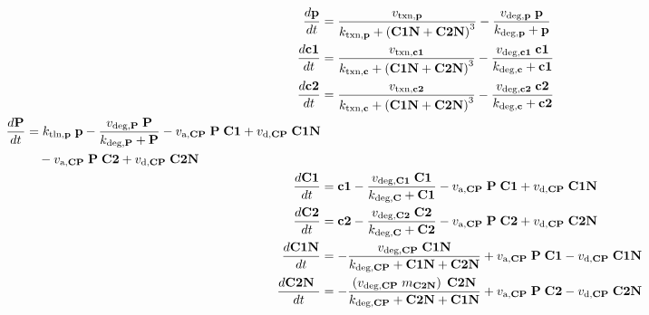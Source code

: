 \begin{model}[p]
  \centering

  \begin{align}
    \label{eq:p}
    \frac{d\mathrm{\bf p}}{dt}    & = \frac{v_{\text{txn,{\bf p}}}}{k_{\text{txn,{\bf p}}} + \left(\text{\bf C1N} + \text{\bf C2N} \right)^3} - \frac{v_{\text{deg,{\bf p}}} \;\text{\bf p} }{k_{\text{deg,{\bf p}}} +\text{\bf p} } \\
    \label{eq:c1}
    \frac{d\text{\bf c1}}{dt}   & = \frac{v_{\text{txn,{\bf c1}}}}{k_{\text{txn,{\bf c}}} + \left(\text{\bf C1N} + \text{\bf C2N} \right)^3} - \frac{v_{\text{deg,{\bf c1}}} \;\text{\bf c1} }{k_{\text{deg,{\bf c}}} +\text{\bf c1} } \\
    \label{eq:c2}
    \frac{d\text{\bf c2}}{dt}   & = \frac{v_{\text{txn,{\bf c2}}}}{k_{\text{txn,{\bf c}}} + \left(\text{\bf C1N} + \text{\bf C2N} \right)^3} - \frac{v_{\text{deg,{\bf c2}}} \;\text{\bf c2} }{k_{\text{deg,{\bf c}}} +\text{\bf c2} } \\
    \begin{split}
      \frac{d\text{\bf P}}{dt}  & = k_\text{tln,{\bf p}} \;\text{\bf p}  - \frac{v_{\text{deg,{\bf P}}} \;\text{\bf P} }{k_{\text{deg,{\bf P}}} +\text{\bf P} } - v_{\text{a,{\bf CP}}} \;\text{\bf P}  \;\text{\bf C1}  + v_{\text{d,{\bf CP}}} \;\text{\bf C1N} \\
      & \quad - v_{\text{a,{\bf CP}}} \;\text{\bf P}  \;\text{\bf C2}  + v_{\text{d,{\bf CP}}} \; \text{\bf C2N}
    \end{split} \\
    \frac{d\text{\bf C1}}{dt}   & =\text{\bf c1}  - \frac{v_{\text{deg,{\bf C1}}} \;\text{\bf C1} }{k_{\text{deg,{\bf C}}} +\text{\bf C1} } - v_{\text{a,{\bf CP}}} \;\text{\bf P}  \;\text{\bf C1}  + v_{\text{d,{\bf CP}}} \;\text{\bf C1N} \\
    \frac{d\text{\bf C2}}{dt}   & =\text{\bf c2} - \frac{ v_{\text{deg,{\bf C2}}} \;\text{\bf C2} }{k_{\text{deg,{\bf C}}} +\text{\bf C2} } - v_{\text{a,{\bf CP}}} \;\text{\bf P}  \;\text{\bf C2}  + v_{\text{d,{\bf CP}}} \; \text{\bf C2N} \\
    \frac{d\text{\bf C1N}}{dt}  & = - \frac{ v_{\text{deg,{\bf CP}}} \;\text{\bf C1N} }{k_{\text{deg,{\bf CP}}} +\text{\bf C1N}  + \text{\bf C2N} } + v_{\text{a,{\bf CP}}} \;\text{\bf P}  \;\text{\bf C1} - v_{\text{d,{\bf CP}}} \;\text{\bf C1N} \\
    \label{eq:C2N}
    \frac{d\text{\bf C2N }}{dt} & = - \frac{ \left(v_{\text{deg,{\bf CP}}} \; m_{\text{\bf C2N}}\right) \; \text{\bf C2N} }{k_{\text{deg,{\bf CP}}} + \text{\bf C2N}  +\text{\bf C1N} } + v_{\text{a,{\bf CP}}} \;\text{\bf P}  \;\text{\bf C2} - v_{\text{d,{\bf CP}}} \; \text{\bf C2N}
  \end{align}
  \label{mod:hirota}
\end{model}


